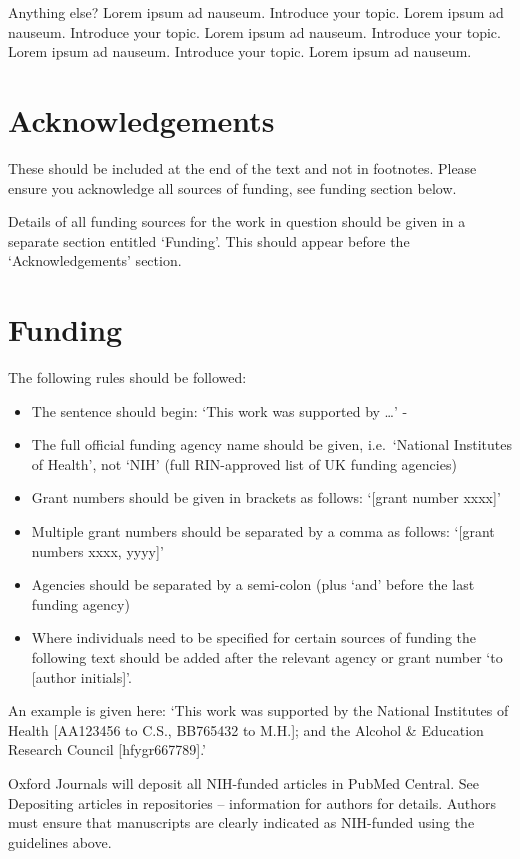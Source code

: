 \documentclass{bioinfo}
\providecommand{\tightlist}{%
  \setlength{\itemsep}{0pt}\setlength{\parskip}{0pt}}
\begin{document}
Anything else? Lorem ipsum ad nauseum. Introduce your topic. Lorem ipsum
ad nauseum. Introduce your topic. Lorem ipsum ad nauseum. Introduce your
topic. Lorem ipsum ad nauseum. Introduce your topic. Lorem ipsum ad
nauseum.

\section*{Acknowledgements}

These should be included at the end of the text and not in footnotes.
Please ensure you acknowledge all sources of funding, see funding
section below.

Details of all funding sources for the work in question should be given
in a separate section entitled `Funding'. This should appear before the
`Acknowledgements' section.

\section*{Funding}

The following rules should be followed:

\begin{itemize}
\tightlist
\item
  The sentence should begin: `This work was supported by \ldots{}' -
\item
  The full official funding agency name should be given, i.e.~`National
  Institutes of Health', not `NIH' (full RIN-approved list of UK funding
  agencies)
\item
  Grant numbers should be given in brackets as follows: `{[}grant number
  xxxx{]}'
\item
  Multiple grant numbers should be separated by a comma as follows:
  `{[}grant numbers xxxx, yyyy{]}'
\item
  Agencies should be separated by a semi-colon (plus `and' before the
  last funding agency)
\item
  Where individuals need to be specified for certain sources of funding
  the following text should be added after the relevant agency or grant
  number `to {[}author initials{]}'.
\end{itemize}

An example is given here: `This work was supported by the National
Institutes of Health {[}AA123456 to C.S., BB765432 to M.H.{]}; and the
Alcohol \& Education Research Council {[}hfygr667789{]}.'

Oxford Journals will deposit all NIH-funded articles in PubMed Central.
See Depositing articles in repositories -- information for authors for
details. Authors must ensure that manuscripts are clearly indicated as
NIH-funded using the guidelines above.




\end{document}
